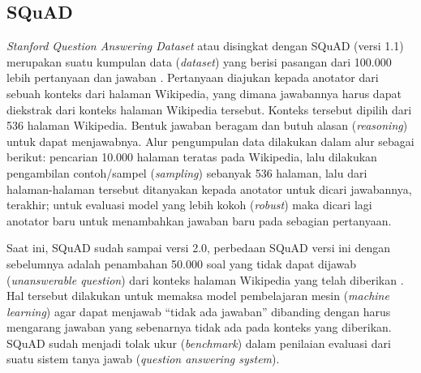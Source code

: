 \subsection{SQuAD}
\emph{Stanford Question Answering Dataset} atau disingkat dengan SQuAD (versi 1.1) merupakan suatu kumpulan data (\emph{dataset}) yang berisi pasangan dari 100.000 lebih pertanyaan dan jawaban \citep{rajpurkar-etal-2016-squad}. Pertanyaan diajukan kepada anotator dari sebuah konteks dari halaman Wikipedia, yang dimana jawabannya harus dapat diekstrak dari konteks halaman Wikipedia tersebut. Konteks tersebut dipilih dari 536 halaman Wikipedia. Bentuk jawaban beragam dan butuh alasan (\emph{reasoning}) untuk dapat menjawabnya. Alur pengumpulan data dilakukan dalam alur sebagai berikut: pencarian 10.000 halaman teratas pada Wikipedia, lalu dilakukan pengambilan contoh/sampel (\emph{sampling}) sebanyak 536 halaman, lalu dari halaman-halaman tersebut ditanyakan kepada anotator untuk dicari jawabannya, terakhir; untuk evaluasi model yang lebih kokoh (\emph{robust}) maka dicari lagi anotator baru untuk menambahkan jawaban baru pada sebagian pertanyaan.

Saat ini, SQuAD sudah sampai versi 2.0, perbedaan SQuAD versi ini dengan sebelumnya adalah penambahan 50.000 soal yang tidak dapat dijawab (\emph{unanswerable question}) dari konteks halaman Wikipedia yang telah diberikan \citep{rajpurkar-etal-2018-know}. Hal tersebut dilakukan untuk memaksa model pembelajaran mesin (\emph{machine learning}) agar dapat menjawab “tidak ada jawaban” dibanding dengan harus mengarang jawaban yang sebenarnya tidak ada pada konteks yang diberikan. SQuAD sudah menjadi tolak ukur (\emph{benchmark}) dalam penilaian evaluasi dari suatu sistem tanya jawab (\emph{question answering system}).

